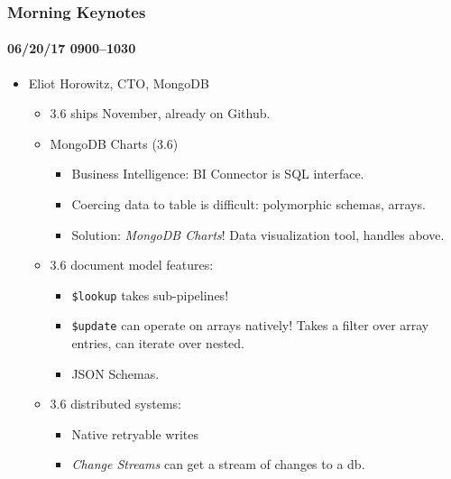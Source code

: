 \documentclass[xcolor=dvipsnames, 9pt]{beamer}
\begin{document}
\begin{frame}
    \frametitle{Morning Keynotes}
    \framesubtitle{06/20/17 0900--1030}
    \begin{itemize}
        \item Eliot Horowitz, CTO, MongoDB
            \begin{itemize}
                \item 3.6 ships November, already on Github.
                \item MongoDB Charts (3.6)
                    \begin{itemize}
                        \item Business Intelligence: BI Connector is SQL
                            interface.
                        \item Coercing data to table is difficult:
                            polymorphic schemas, arrays.
                        \item Solution: \emph{MongoDB Charts}! Data
                            visualization tool, handles above.
                    \end{itemize}

                \item 3.6 document model features:
                    \begin{itemize}
                        \item \texttt{\$lookup} takes sub-pipelines!
                        \item \texttt{\$update} can operate on arrays
                            natively! Takes a filter over array entries,
                            can iterate over nested.
                        \item JSON Schemas.
                    \end{itemize}

                \item 3.6 distributed systems:
                    \begin{itemize}
                        \item Native retryable writes
                        \item \emph{Change Streams} can get a stream of changes
                            to a db.
                    \end{itemize}
            \end{itemize}
    \end{itemize}
\end{frame}
\end{document}

